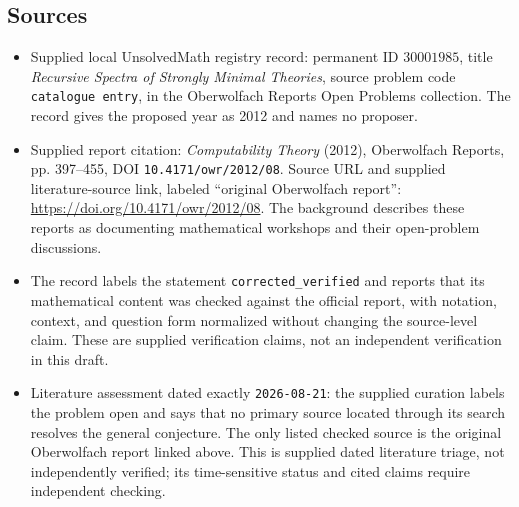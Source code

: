 \documentclass[11pt]{article}
\begin{document}
\subsection{Sources}
\begin{itemize}
\item Supplied local UnsolvedMath registry record: permanent ID \(30001985\), title \emph{Recursive Spectra of Strongly Minimal Theories}, source problem code \texttt{catalogue entry}, in the Oberwolfach Reports Open Problems collection. The record gives the proposed year as 2012 and names no proposer.
\item Supplied report citation: \emph{Computability Theory} (2012), Oberwolfach Reports, pp. 397--455, DOI \texttt{10.4171/owr/2012/08}. Source URL and supplied literature-source link, labeled ``original Oberwolfach report'': \url{https://doi.org/10.4171/owr/2012/08}. The background describes these reports as documenting mathematical workshops and their open-problem discussions.
\item The record labels the statement \texttt{corrected\_verified} and reports that its mathematical content was checked against the official report, with notation, context, and question form normalized without changing the source-level claim. These are supplied verification claims, not an independent verification in this draft.
\item Literature assessment dated exactly \texttt{2026-08-21}: the supplied curation labels the problem open and says that no primary source located through its search resolves the general conjecture. The only listed checked source is the original Oberwolfach report linked above. This is supplied dated literature triage, not independently verified; its time-sensitive status and cited claims require independent checking.
\end{itemize}
\end{document}
